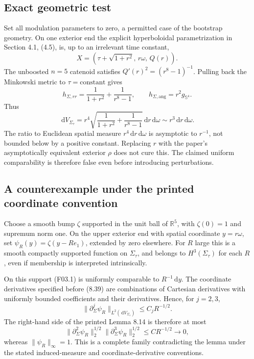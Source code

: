 \documentclass[10pt]{article}
\begin{document}
\subsection*{Exact geometric test}
Set all modulation parameters to zero, a permitted case of the bootstrap geometry. On one exterior end the explicit hyperboloidal parametrization in Section 4.1, (4.5), is, up to an irrelevant time constant, \[X=(\tau+\sqrt{1+r^2},\,r\omega,\,Q(r)).\] The unboosted \(n=5\) catenoid satisfies \(Q'(r)^2=(r^8-1)^{-1}\). Pulling back the Minkowski metric to \(\tau=\mathrm{constant}\) gives \[h_{\Sigma,rr}=\frac1{1+r^2}+\frac1{r^8-1},\qquad
h_{\Sigma,\mathrm{ang}}=r^2g_{\mathbb S^4}.\] Thus \[\,\mathrm dV_{\Sigma_\tau}
=r^4\sqrt{\frac1{1+r^2}+\frac1{r^8-1}}\,\mathrm dr\,\mathrm d\omega
\sim r^3\,\mathrm dr\,\mathrm d\omega .
\tag{F03.1}\] The ratio to Euclidean spatial measure \(r^4\,\mathrm dr\,\mathrm d\omega\) is asymptotic to \(r^{-1}\), not bounded below by a positive constant. Replacing \(r\) with the paper’s asymptotically equivalent exterior \(\rho\) does not cure this. The claimed uniform comparability is therefore false even before introducing perturbations.\par
\subsection*{A counterexample under the printed coordinate convention}
Choose a smooth bump \(\zeta\) supported in the unit ball of \(\mathbb R^5\), with \(\zeta(0)=1\) and supremum norm one. On the upper exterior end with spatial coordinate \(y=r\omega\), set \(\psi_R(y)=\zeta(y-Re_1)\), extended by zero elsewhere. For \(R\) large this is a smooth compactly supported function on \(\Sigma_\tau\), and belongs to \(H^3(\Sigma_\tau)\) for each \(R\), even if membership is interpreted intrinsically.\par
On this support (F03.1) is uniformly comparable to \(R^{-1}\,\mathrm dy\). The coordinate derivatives specified before (8.39) are combinations of Cartesian derivatives with uniformly bounded coefficients and their derivatives. Hence, for \(j=2,3\), \[\|\partial_\Sigma^j\psi_R\|_{L^2(\,\mathrm dV_{\Sigma_\tau})}
\leq C_j R^{-1/2}.\] The right-hand side of the printed Lemma 8.14 is therefore at most \[\|\partial_\Sigma^2\psi_R\|_2^{1/2}
\|\partial_\Sigma^3\psi_R\|_2^{1/2}
\leq C R^{-1/2}\longrightarrow0,\] whereas \(\|\psi_R\|_\infty=1\). This is a complete family contradicting the lemma under the stated induced-measure and coordinate-derivative conventions.\par
\end{document}
